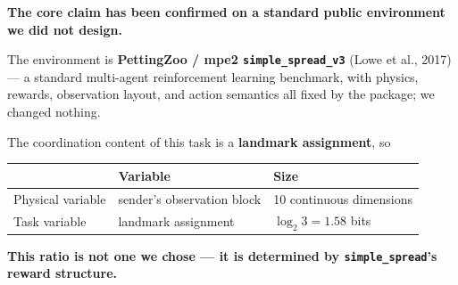 \documentclass[11pt]{article}
\begin{document}
\textbf{The core claim has been confirmed on a standard public environment we did not design.}

The environment is \textbf{PettingZoo / mpe2 \texttt{simple\_spread\_v3}} (Lowe et al., 2017) --- a standard multi-agent reinforcement learning benchmark, with physics, rewards, observation layout, and action semantics all fixed by the package; we changed nothing.

The coordination content of this task is a \textbf{landmark assignment}, so

\begin{longtable}[]{@{}lll@{}}
\toprule
& Variable & Size\tabularnewline
\midrule
\endhead
Physical variable & sender's observation block & 10 continuous dimensions\tabularnewline
Task variable & landmark assignment & \(\log_2 3=\mathbf{1.58}\) bits\tabularnewline
\bottomrule
\end{longtable}

\textbf{This ratio is not one we chose --- it is determined by \texttt{simple\_spread}'s reward structure.}
\end{document}
